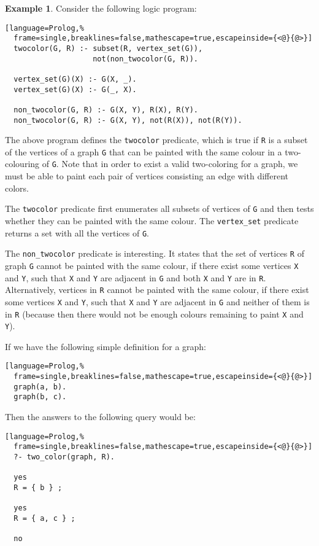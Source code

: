 \documentclass[inscr,ack,preface]{dithesis}
\theoremstyle{definition}
\newtheorem{example}{Example}[chapter]
\begin{document}
\begin{example} Consider the following logic program:
\begin{lstlisting}[language=Prolog,%
  frame=single,breaklines=false,mathescape=true,escapeinside={<@}{@>}]
  twocolor(G, R) :- subset(R, vertex_set(G)),
                    not(non_twocolor(G, R)).

  vertex_set(G)(X) :- G(X, _).
  vertex_set(G)(X) :- G(_, X).

  non_twocolor(G, R) :- G(X, Y), R(X), R(Y).
  non_twocolor(G, R) :- G(X, Y), not(R(X)), not(R(Y)).
\end{lstlisting}
The above program defines the \texttt{twocolor} predicate, which is true if \texttt{R} is a subset of the vertices of a graph \texttt{G} that can be painted with the same colour in a two-colouring of \texttt{G}. Note that in order to exist a valid two-coloring for a graph, we must be able to paint each pair of vertices consisting an edge with different colors.

The \texttt{twocolor} predicate first enumerates all subsets of vertices of \texttt{G} and then tests whether they can be painted with the same colour. The \texttt{vertex\_set} predicate returns a set with all the vertices of \texttt{G}.

The \texttt{non\_twocolor} predicate is interesting. It states that the set of vertices \texttt{R} of graph \texttt{G} cannot be painted with the same colour, if there exist some vertices \texttt{X} and \texttt{Y}, such that \texttt{X} and \texttt{Y} are adjacent in \texttt{G} and both \texttt{X} and \texttt{Y} are in \texttt{R}. Alternatively, vertices in \texttt{R} cannot be painted with the same colour, if there exist some vertices \texttt{X} and \texttt{Y}, such that \texttt{X} and \texttt{Y} are adjacent in \texttt{G} and neither of them is in \texttt{R} (because then there would not be enough colours remaining to paint \texttt{X} and \texttt{Y}).

If we have the following simple definition for a graph:
\begin{lstlisting}[language=Prolog,%
  frame=single,breaklines=false,mathescape=true,escapeinside={<@}{@>}]
  graph(a, b).
  graph(b, c).
\end{lstlisting}

Then the answers to the following query would be:
\begin{lstlisting}[language=Prolog,%
  frame=single,breaklines=false,mathescape=true,escapeinside={<@}{@>}]
  ?- two_color(graph, R).

  yes
  R = { b } ;

  yes
  R = { a, c } ;

  no
\end{lstlisting}
\end{example}
\end{document}
